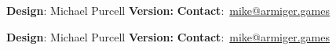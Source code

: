 \documentclass[a4paper, parskip=half, 11pt]{scrartcl}
\begin{document}
\vfill

\hrulefill

{\textbf{Design}: Michael Purcell \hfill \makeatletter\textbf{Version:} \@version\makeatother \hfill \textbf{Contact}:~\href{mailto:mike@armiger.games}{mike@armiger.games}}

\newpage

\begin{multicols}{2}






\vfill\null
\columnbreak







\vfill\null

\end{multicols}

\vfill

\hrulefill

{\textbf{Design}: Michael Purcell \hfill \makeatletter\textbf{Version:} \@version\makeatother \hfill \textbf{Contact}:~\href{mailto:mike@armiger.games}{mike@armiger.games}}
\end{document}
